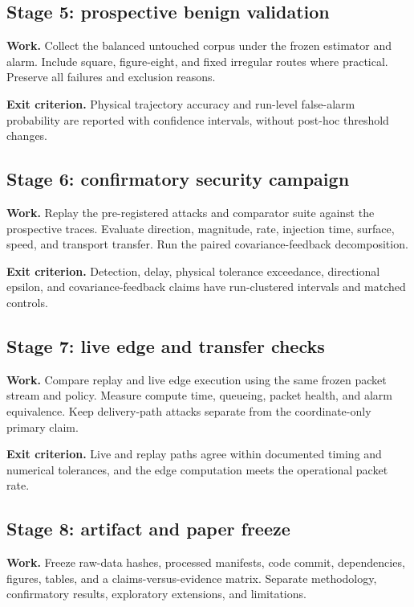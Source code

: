 \documentclass[11pt,a4paper]{article}
\begin{document}
\subsection{Stage 5: prospective benign validation}

\textbf{Work.} Collect the balanced untouched corpus under the frozen
estimator and alarm. Include square, figure-eight, and fixed irregular routes
where practical. Preserve all failures and exclusion reasons.

\textbf{Exit criterion.} Physical trajectory accuracy and run-level
false-alarm probability are reported with confidence intervals, without
post-hoc threshold changes.

\subsection{Stage 6: confirmatory security campaign}

\textbf{Work.} Replay the pre-registered attacks and comparator suite against
the prospective traces. Evaluate direction, magnitude, rate, injection time,
surface, speed, and transport transfer. Run the paired covariance-feedback
decomposition.

\textbf{Exit criterion.} Detection, delay, physical tolerance exceedance,
directional epsilon, and covariance-feedback claims have run-clustered
intervals and matched controls.

\subsection{Stage 7: live edge and transfer checks}

\textbf{Work.} Compare replay and live edge execution using the same frozen
packet stream and policy. Measure compute time, queueing, packet health, and
alarm equivalence. Keep delivery-path attacks separate from the coordinate-only
primary claim.

\textbf{Exit criterion.} Live and replay paths agree within documented timing
and numerical tolerances, and the edge computation meets the operational packet
rate.

\subsection{Stage 8: artifact and paper freeze}

\textbf{Work.} Freeze raw-data hashes, processed manifests, code commit,
dependencies, figures, tables, and a claims-versus-evidence matrix. Separate
methodology, confirmatory results, exploratory extensions, and limitations.
\end{document}
